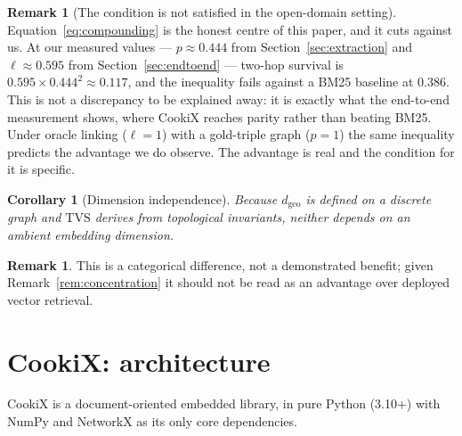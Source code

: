 \documentclass[11pt]{article}
\newtheorem{corollary}[theorem]{Corollary}
\theoremstyle{definition}
\newtheorem{remark}[theorem]{Remark}
\begin{document}
\begin{remark}[The condition is not satisfied in the open-domain setting]
\label{rem:condition-fails}
Equation~\eqref{eq:compounding} is the honest centre of this paper, and it cuts against
us. At our measured values --- $p\approx0.444$ from Section~\ref{sec:extraction} and
$\ell\approx0.595$ from Section~\ref{sec:endtoend} --- two-hop survival is
$0.595\times0.444^2\approx0.117$, and the inequality fails against a BM25 baseline at
$0.386$. This is not a discrepancy to be explained away: it is exactly what the
end-to-end measurement shows, where CookiX reaches parity rather than beating BM25.
Under oracle linking ($\ell=1$) with a gold-triple graph ($p=1$) the same inequality
predicts the advantage we do observe. The advantage is real and the condition for it is
specific.
\end{remark}

\begin{corollary}[Dimension independence]
Because $d_{\mathrm{geo}}$ is defined on a discrete graph and $\mathrm{TVS}$ derives
from topological invariants, neither depends on an ambient embedding dimension.
\end{corollary}

\begin{remark}
This is a categorical difference, not a demonstrated benefit; given
Remark~\ref{rem:concentration} it should not be read as an advantage over deployed
vector retrieval.
\end{remark}

\section{CookiX: architecture}
\label{sec:cookix}

CookiX is a document-oriented embedded library, in pure Python (3.10+) with NumPy and
NetworkX as its only core dependencies.
\end{document}
